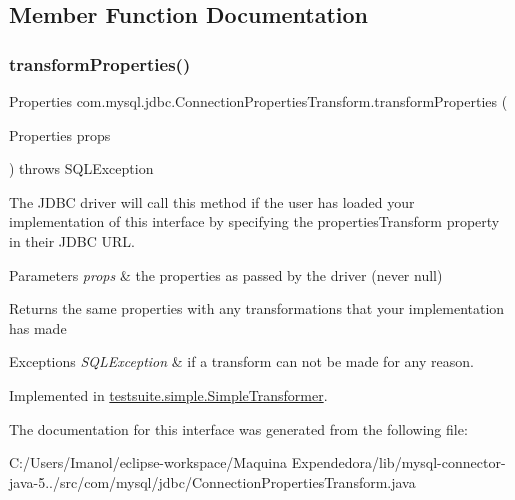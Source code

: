 \subsection{Member Function Documentation}
\mbox{\label{interfacecom_1_1mysql_1_1jdbc_1_1_connection_properties_transform_a044765ce0ad5bcba0276eac61fe8e04d}} 
\subsubsection{\texorpdfstring{transform\+Properties()}{transformProperties()}}
{\footnotesize\ttfamily Properties com.\+mysql.\+jdbc.\+Connection\+Properties\+Transform.\+transform\+Properties (\begin{DoxyParamCaption}\item[{Properties}]{props }\end{DoxyParamCaption}) throws S\+Q\+L\+Exception}

The J\+D\+BC driver will call this method if the user has loaded your implementation of this interface by specifying the \textquotesingle{}properties\+Transform\textquotesingle{} property in their J\+D\+BC U\+RL.


\begin{DoxyParams}{Parameters}
{\em props} & the properties as passed by the driver (never null)\\
\hline
\end{DoxyParams}
\begin{DoxyReturn}{Returns}
the same properties with any transformations that your implementation has made
\end{DoxyReturn}

\begin{DoxyExceptions}{Exceptions}
{\em S\+Q\+L\+Exception} & if a transform can not be made for any reason. \\
\hline
\end{DoxyExceptions}


Implemented in \mbox{\hyperlink{classtestsuite_1_1simple_1_1_simple_transformer_aadfc91d352f3a7b94257f30b319cb258}{testsuite.\+simple.\+Simple\+Transformer}}.



The documentation for this interface was generated from the following file\+:\begin{DoxyCompactItemize}
\item 
C\+:/\+Users/\+Imanol/eclipse-\/workspace/\+Maquina Expendedora/lib/mysql-\/connector-\/java-\/5../src/com/mysql/jdbc/Connection\+Properties\+Transform.\+java\end{DoxyCompactItemize}
